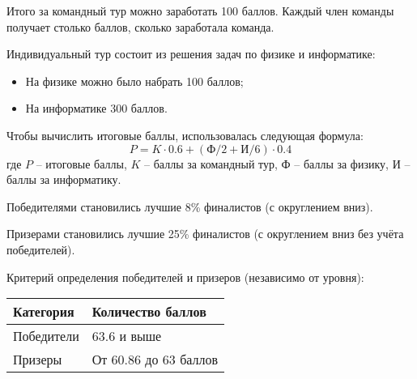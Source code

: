 Итого за командный тур можно заработать 100 баллов. Каждый член команды получает столько баллов, сколько заработала команда.
 
Индивидуальный тур состоит из решения задач по физике и информатике:
\begin{itemize}
    \item На физике можно было набрать 100 баллов;
    \item На информатике 300 баллов.
\end{itemize}
 
Чтобы вычислить итоговые баллы, использовалась следующая формула:
$$P = K \cdot 0.6 + (\text{Ф}/2+\text{И}/6) \cdot 0.4$$
где $P$ – итоговые баллы, $K$ – баллы за командный тур, $\text{Ф}$ – баллы за физику, $\text{И}$ –
баллы за информатику.

Победителями становились лучшие 8\% финалистов (с округлением вниз).

Призерами становились лучшие 25\% финалистов (с округлением вниз без учёта победителей).

Критерий определения победителей и призеров (независимо от уровня):
\begin{center}
    \begin{tabular}{|l|l|}
        \hline
        Категория&Количество баллов\\
        \hline
        Победители&63.6 и выше\\
        \hline
        Призеры&От 60.86 до 63 баллов\\
        \hline
    \end{tabular}
\end{center}
